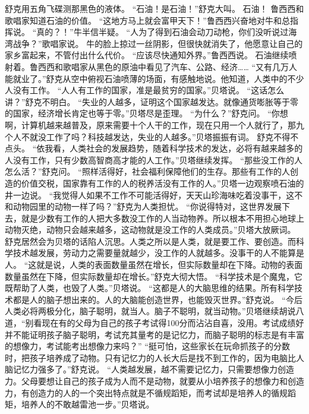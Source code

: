 \documentclass[a4paper,12pt,UTF8,twoside]{ctexbook}
\begin{document}
        舒克用五角飞碟测那黑色的液体。  
        “石油！是石油！”舒克大叫。  
        石油！  
        鲁西西和歌唱家知道石油的价值。  
        “这地方马上就会富甲天下！”鲁西西兴奋地对牛和总指挥说。  
        “真的？！”牛半信半疑。  
        “人为了得到石油会动刀动枪，你们没听说过海湾战争？”歌唱家说。  
        牛的脸上掠过一丝阴影，但很快就消失了，他愿意让自己的家乡富起来，不管付出什么代价。        
        “应该尽快通知外界。”鲁西西说。  
        石油继续喷射着。鲁西西和歌唱家从黑色的原油中看见了汽车、公路、经济……  
        “又有几万人能就业了。”舒克从空中俯视石油喷薄的场面，有感触地说。他知道，人类中的不少人没有工作。  
        “人人有工作的国家，准是最贫穷的国家。”贝塔说。  
        “这话怎么讲？”舒克不明白。  
        “失业的人越多，证明这个国家越发达。就像通货嘭胀等于零的国家，经济增长肯定也等于零。”贝塔尽是歪理。  
        “为什么？”舒克问。  
        “你想啊，计算机越来越普及，原来需要十个人干的工作，现在只用一个人就行了，那九个人不就没工作了吗？科技越发达，失业的人越多。”贝塔振振有词。  
        舒克不得不点头。  
        “依我看，人类社会的发展趋势，随着科学技术的发达，必将有越来越多的人没有工作，只有少数高智商高才能的人工作。”贝塔继续发挥。  
        “那些没工作的人怎么活？”舒克问。  
        “照样活得好，社会福利保障他们的生存。那些有工作的人创造的价值交税，国家靠有工作的人的税养活没有工作的人。”贝塔一边观察喷石油的井一边说。  
        “我觉得人如果不工作不可能活得好，天天山珍海味吃着没事干，这不和动物园里的动物一样了吗？”舒克为人类担忧。  
        “你说得特对，这世界发展下去，就是少数有工作的人把大多数没工作的人当动物养。所以根本不用担心地球上动物灭绝，动物只会越来越多，这动物就是没工作的人类成员。”贝塔大放厥词。  
        舒克居然会为贝塔的话陷人沉思。人类之所以是人类，就是要工作、要创造。而科学技术越发展，劳动力之需要量就越少，没工作的人就越多。没事干的人不能算是人。  
        “这就是说，人类的表面数量虽然在增长，但实际数量却在下降。动物的表面数量虽然在下降，但实际数量却在增长。”舒克大彻大悟。  
        “科学技术是个魔鬼，它既帮助了人类，也毁了人类。”贝塔说。  
        “这都是人的大脑思维的结果。所有科学技术都是人的脑子想出来的。人的大脑能创造世界，也能毁灭世界。”舒克说。  
        “今后人类必将两极分化，脑子聪明，就当人。脑子不聪明，就当动物。”贝塔继续胡说八道，“别看现在有的父母为自己的孩子考试得100分而沾沾自喜，没用。考试成绩好并不能证明孩子脑子聪明，考试充其量考的是记忆力，而脑子聪明的标志是有丰富的想像力，考试能考出想像力来吗？”  
        “挺可怕，这些家长在玩命抓孩子的分数时，把孩子培养成了动物。只有记忆力的人长大后是找不到工作的，因为电脑比人脑记忆力强多了。”舒克说。  
        “人类越发展，越不需要记忆力，只需要想像力创造力。父母要想让自己的孩子成为人而不是动物，就要从小培养孩子的想像力和创造力，有创造力的人的一个突出特点就是不循规蹈矩，而考试却是培养人的循规蹈矩，培养人的不敢越雷池一步。”贝塔说。  
\end{document}
